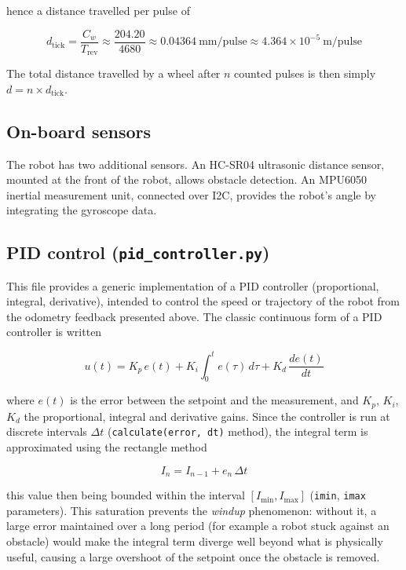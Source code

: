 \documentclass[12pt,a4paper]{report}
\begin{document}
	hence a distance travelled per pulse of
	
	\begin{equation}
		d_{\text{tick}} = \frac{C_w}{T_{\text{rev}}} \approx \frac{204.20}{4680} \approx 0.04364\ \text{mm/pulse} \approx 4.364 \times 10^{-5}\ \text{m/pulse}
		\label{eq:tick-distance}
	\end{equation}
	
	The total distance travelled by a wheel after $n$ counted pulses is then simply $d = n \times d_{\text{tick}}$.
	
	\subsection*{On-board sensors}
	
	The robot has two additional sensors. An HC-SR04 ultrasonic distance sensor, mounted at the front of the robot, allows obstacle detection. An MPU6050 inertial measurement unit, connected over I2C, provides the robot's angle by integrating the gyroscope data.
	
	\subsection*{PID control (\texttt{pid\_controller.py})}
	
	This file provides a generic implementation of a PID controller (proportional, integral, derivative), intended to control the speed or trajectory of the robot from the odometry feedback presented above. The classic continuous form of a PID controller is written
	
	\begin{equation}
		u(t) = K_p\,e(t) + K_i \int_0^{t} e(\tau)\,d\tau + K_d \,\frac{de(t)}{dt}
		\label{eq:pid-continu}
	\end{equation}
	
	where $e(t)$ is the error between the setpoint and the measurement, and $K_p$, $K_i$, $K_d$ the proportional, integral and derivative gains. Since the controller is run at discrete intervals $\Delta t$ (\texttt{calculate(error, dt)} method), the integral term is approximated using the rectangle method
	
	\begin{equation}
		I_n = I_{n-1} + e_n \, \Delta t
		\label{eq:pid-integral}
	\end{equation}
	
	this value then being bounded within the interval $[I_{\min}, I_{\max}]$ (\texttt{imin}, \texttt{imax} parameters). This saturation prevents the \textit{windup} phenomenon: without it, a large error maintained over a long period (for example a robot stuck against an obstacle) would make the integral term diverge well beyond what is physically useful, causing a large overshoot of the setpoint once the obstacle is removed.
	
\end{document}
